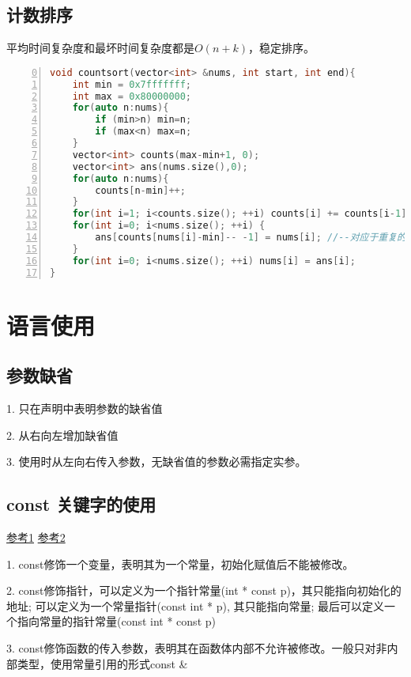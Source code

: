 \subsection{计数排序}
平均时间复杂度和最坏时间复杂度都是$O(n+k)$，稳定排序。
\begin{lstlisting}[language=c++,numbers=left,firstnumber = 0,numberstyle=\tiny,breaklines = true,keywordstyle=\color{blue!70},commentstyle=\color{red!50!green!50!blue!50},frame=shadowbox, rulesepcolor=\color{red!20!green!20!blue!20}]
void countsort(vector<int> &nums, int start, int end){
    int min = 0x7fffffff;
    int max = 0x80000000;
    for(auto n:nums){
        if (min>n) min=n;
        if (max<n) max=n;
    }
    vector<int> counts(max-min+1, 0);
    vector<int> ans(nums.size(),0);
    for(auto n:nums){
        counts[n-min]++;
    }
    for(int i=1; i<counts.size(); ++i) counts[i] += counts[i-1];
    for(int i=0; i<nums.size(); ++i) {
        ans[counts[nums[i]-min]-- -1] = nums[i]; //--对应于重复的数字
    }
    for(int i=0; i<nums.size(); ++i) nums[i] = ans[i];
}
\end{lstlisting}




\section{语言使用}
\subsection{参数缺省}
1. 只在声明中表明参数的缺省值

2. 从右向左增加缺省值

3. 使用时从左向右传入参数，无缺省值的参数必需指定实参。

\subsection{const 关键字的使用}
\href{https://blog.csdn.net/lf1570180470/article/details/56677748}{参考1}
\href{https://www.cnblogs.com/azbane/p/7266747.html}{参考2}

1. const修饰一个变量，表明其为一个常量，初始化赋值后不能被修改。

2. const修饰指针，可以定义为一个指针常量(int * const p)，其只能指向初始化的地址; 可以定义为一个常量指针(const int * p), 其只能指向常量; 最后可以定义一个指向常量的指针常量(const int * const p)

3. const修饰函数的传入参数，表明其在函数体内部不允许被修改。一般只对非内部类型，使用常量引用的形式const \&

